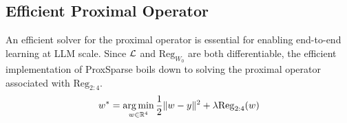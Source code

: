 \subsection{Efficient Proximal Operator}
\label{sec_effi_proximal}
An efficient solver for the proximal operator is essential for enabling end-to-end learning at LLM scale. Since $\mathcal{L}$ and $\text{Reg}_{W_0}$ are both differentiable, the efficient implementation of ProxSparse
boils down to solving the proximal operator associated with $\text{Reg}_{2:4}$.
\begin{equation}\label{eq:prox}
\small
    w^* = \operatorname*{arg\,min}_{w \in \mathbb{R}^4} \frac{1}{2} \|w - y\|^2 + \lambda \mathrm{Reg}_{2:4}(w)  
\end{equation}

